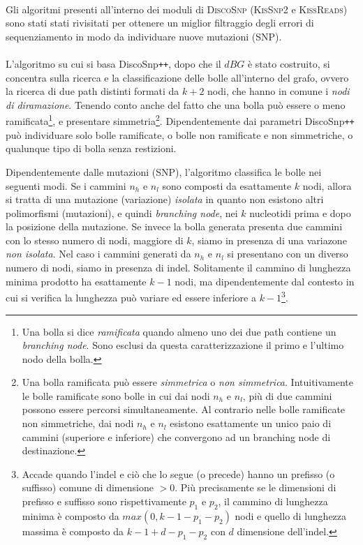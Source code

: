 \documentclass[../main.tex]{subfiles}
\begin{document}
\paragraph{} Gli algoritmi presenti all'interno dei moduli di \textsc{DiscoSnp} (\textsc{KisSnp2} e \textsc{KissReads}) sono stati stati rivisitati per ottenere un miglior filtraggio degli errori di sequenziamento in modo da individuare nuove mutazioni (SNP). 

\paragraph{}
L'algoritmo su cui si basa DiscoSnp\texttt{++}, dopo che il $dBG$ è stato costruito, si concentra sulla ricerca e la classificazione delle bolle all'interno del grafo, ovvero la ricerca di due path distinti formati da $k+2$ nodi, che hanno in comune i \textit{nodi di diramazione}. Tenendo conto anche del fatto che una bolla può essere o meno ramificata\footnote{Una bolla si dice \textit{ramificata} quando almeno uno dei due path contiene un \textit{branching node}. Sono esclusi da questa caratterizzazione il primo e l'ultimo nodo della bolla.}, e presentare simmetria\footnote{Una bolla ramificata può essere \textit{simmetrica} o \textit{non simmetrica}. Intuitivamente le bolle ramificate sono bolle in cui dai nodi $n_h$ e $n_l$, più di due cammini possono essere percorsi simultaneamente. Al contrario nelle bolle ramificate non simmetriche, dai nodi $n_h$ e $n_l$ esistono esattamente un unico paio di cammini (superiore e inferiore) che convergono ad un branching node di destinazione.}. Dipendentemente dai parametri DiscoSnp\texttt{++} può individuare solo bolle ramificate, o bolle non ramificate e non simmetriche, o qualunque tipo di bolla senza restizioni.

Dipendentemente dalle mutazioni (SNP), l'algoritmo classifica le bolle nei seguenti modi. Se i cammini $n_h$ e $n_l$ sono composti da esattamente $k$ nodi, allora si tratta di una mutazione (variazione) \textit{isolata} in quanto non esistono altri polimorfismi (mutazioni), e quindi \textit{branching node}, nei $k$ nucleotidi prima e dopo la posizione della mutazione. Se invece la bolla generata presenta due cammini con lo stesso numero di nodi, maggiore di $k$, siamo in presenza di una variazone \textit{non isolata}. Nel caso i cammini generati da $n_h$ e $n_l$ si presentano con un diverso numero di nodi, siamo in presenza di indel. Solitamente il cammino di lunghezza minima prodotto ha esattamente $k-1$ nodi, ma dipendentemente dal contesto in cui si verifica la lunghezza può variare ed essere inferiore a $k-1$\footnote{Accade quando l'indel e ciò che lo segue (o precede) hanno un prefisso (o suffisso) comune di dimensione $> 0$. Più precisamente se le dimensioni di prefisso e suffisso sono rispettivamente $p_1$ e $p_2$, il cammino di lunghezza minima è composto da $max(0, k-1-p_1 - p_2)$ nodi e quello di lunghezza massima è composto da $k-1+d-p_1 - p_2$ con $d$ dimensione dell'indel.}.
\end{document}
